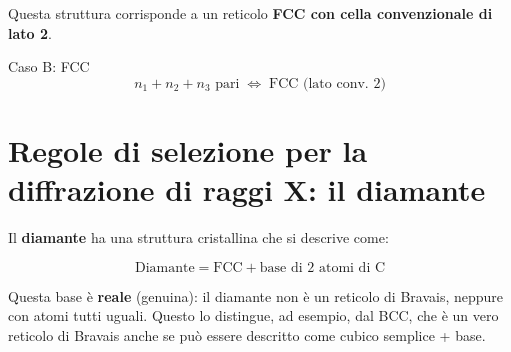 Questa struttura corrisponde a un reticolo \textbf{FCC con cella convenzionale di lato 2}.

\begin{equazione}{Caso B: FCC}
\begin{equation}
n_1 + n_2 + n_3 \text{ pari} \;\Longleftrightarrow\; \text{FCC (lato conv. 2)}
\end{equation}
\end{equazione}



\vspace{0.5cm}
\begin{center}
\end{center}
\vspace{0.5cm}

\newpage
\section{Regole di selezione per la diffrazione di raggi X: il diamante}

Il \textbf{diamante} ha una struttura cristallina che si descrive come:

$$\text{Diamante} = \text{FCC} + \text{base di 2 atomi di C}$$

Questa base è \textbf{reale} (genuina): il diamante non è un reticolo di Bravais, neppure con atomi tutti uguali. Questo lo distingue, ad esempio, dal BCC, che è un vero reticolo di Bravais anche se può essere descritto come cubico semplice + base.

